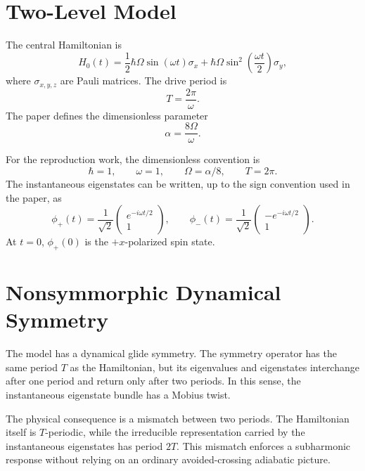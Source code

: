 \documentclass[11pt,a4paper]{article}
\begin{document}
\section{Two-Level Model}

The central Hamiltonian is
\begin{equation}
H_0(t)
= \frac{1}{2}\hbar \Omega \sin(\omega t)\sigma_x
  + \hbar \Omega \sin^2\left(\frac{\omega t}{2}\right)\sigma_y ,
\label{eq:h0}
\end{equation}
where \(\sigma_{x,y,z}\) are Pauli matrices. The drive period is
\begin{equation}
T = \frac{2\pi}{\omega}.
\end{equation}
The paper defines the dimensionless parameter
\begin{equation}
\alpha = \frac{8\Omega}{\omega}.
\end{equation}

For the reproduction work, the dimensionless convention is
\[
\hbar = 1,\qquad \omega = 1,\qquad \Omega = \alpha/8,\qquad T = 2\pi.
\]
The instantaneous eigenstates can be written, up to the sign convention used in the paper, as
\begin{equation}
\phi_+(t)=\frac{1}{\sqrt{2}}
\begin{pmatrix}
e^{-i\omega t/2}\\
1
\end{pmatrix},
\qquad
\phi_-(t)=\frac{1}{\sqrt{2}}
\begin{pmatrix}
-e^{-i\omega t/2}\\
1
\end{pmatrix}.
\end{equation}
At \(t=0\), \(\phi_+(0)\) is the \(+x\)-polarized spin state.

\section{Nonsymmorphic Dynamical Symmetry}

The model has a dynamical glide symmetry. The symmetry operator has the same period \(T\) as the Hamiltonian, but its eigenvalues and eigenstates interchange after one period and return only after two periods. In this sense, the instantaneous eigenstate bundle has a Mobius twist.

The physical consequence is a mismatch between two periods. The Hamiltonian itself is \(T\)-periodic, while the irreducible representation carried by the instantaneous eigenstates has period \(2T\). This mismatch enforces a subharmonic response without relying on an ordinary avoided-crossing adiabatic picture.
\end{document}
